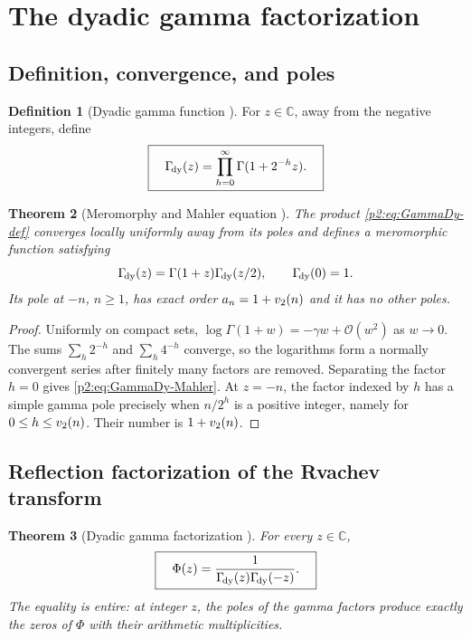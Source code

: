 \documentclass[11pt]{article}
\newtheorem{theorem}{Theorem}[section]
\theoremstyle{definition}
\newtheorem{definition}[theorem]{Definition}
\theoremstyle{remark}
\newcommand{\C}{\mathbb C}
\newcommand{\bigO}{\mathcal O}
\begin{document}
\section{The dyadic gamma factorization}
\label{p2:sec:dyadic-gamma}

\subsection{Definition, convergence, and poles}

\begin{definition}[Dyadic gamma function \New]
For $z\in\C$, away from the negative integers, define
\begin{equation}
 \boxed{\quad
 \Gamma_{\!\mathrm{dy}}(z)=\prod_{h=0}^{\infty}\Gamma(1+2^{-h}z).
 \quad}                                                  \label{p2:eq:GammaDy-def}
\end{equation}
\end{definition}

\begin{theorem}[Meromorphy and Mahler equation \New]
The product \eqref{p2:eq:GammaDy-def} converges locally uniformly away from its poles and defines
a meromorphic function satisfying
\begin{equation}
 \Gamma_{\!\mathrm{dy}}(z)=\Gamma(1+z)\Gamma_{\!\mathrm{dy}}(z/2),
 \qquad \Gamma_{\!\mathrm{dy}}(0)=1.                                  \label{p2:eq:GammaDy-Mahler}
\end{equation}
Its pole at $-n$, $n\ge1$, has exact order $a_n=1+v_2(n)$ and it has no other poles.
\end{theorem}

\begin{proof}
Uniformly on compact sets, $\log\Gamma(1+w)=-\gamma w+\bigO(w^2)$ as $w\to0$.
The sums $\sum_h2^{-h}$ and $\sum_h4^{-h}$ converge, so the logarithms form a normally
convergent series after finitely many factors are removed.  Separating the factor $h=0$
gives \eqref{p2:eq:GammaDy-Mahler}.  At $z=-n$, the factor indexed by $h$ has a simple gamma
pole precisely when $n/2^h$ is a positive integer, namely for $0\le h\le v_2(n)$.  Their
number is $1+v_2(n)$.
\end{proof}

\subsection{Reflection factorization of the Rvachev transform}

\begin{theorem}[Dyadic gamma factorization \New]
For every $z\in\C$,
\begin{equation}
 \boxed{\quad
 \Phi(z)=\frac{1}{\Gamma_{\!\mathrm{dy}}(z)\Gamma_{\!\mathrm{dy}}(-z)}.
 \quad}                                                  \label{p2:eq:Phi-GammaDy}
\end{equation}
The equality is entire: at integer $z$, the poles of the gamma factors produce exactly the
zeros of $\Phi$ with their arithmetic multiplicities.
\end{theorem}
\end{document}

